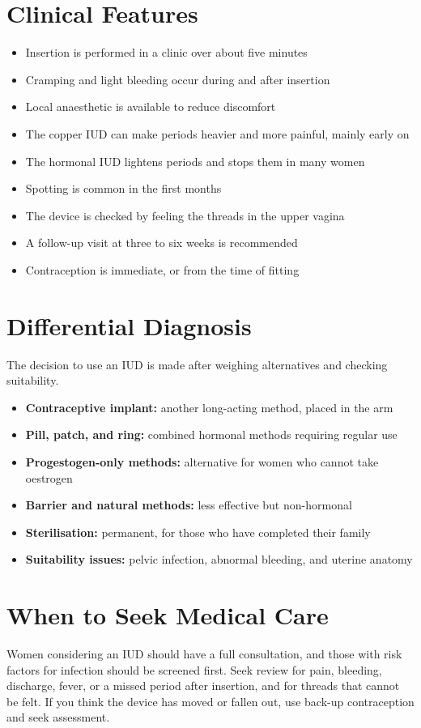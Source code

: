 \section*{Clinical Features}
\begin{itemize}
    \item Insertion is performed in a clinic over about five minutes
    \item Cramping and light bleeding occur during and after insertion
    \item Local anaesthetic is available to reduce discomfort
    \item The copper IUD can make periods heavier and more painful, mainly early on
    \item The hormonal IUD lightens periods and stops them in many women
    \item Spotting is common in the first months
    \item The device is checked by feeling the threads in the upper vagina
    \item A follow-up visit at three to six weeks is recommended
    \item Contraception is immediate, or from the time of fitting
\end{itemize}

\section*{Differential Diagnosis}
The decision to use an IUD is made after weighing alternatives and checking suitability.
\begin{itemize}
    \item \textbf{Contraceptive implant:} another long-acting method, placed in the arm
    \item \textbf{Pill, patch, and ring:} combined hormonal methods requiring regular use
    \item \textbf{Progestogen-only methods:} alternative for women who cannot take oestrogen
    \item \textbf{Barrier and natural methods:} less effective but non-hormonal
    \item \textbf{Sterilisation:} permanent, for those who have completed their family
    \item \textbf{Suitability issues:} pelvic infection, abnormal bleeding, and uterine anatomy
\end{itemize}

\section*{When to Seek Medical Care}
Women considering an IUD should have a full consultation, and those with risk factors for infection should be screened first. Seek review for pain, bleeding, discharge, fever, or a missed period after insertion, and for threads that cannot be felt. If you think the device has moved or fallen out, use back-up contraception and seek assessment.


